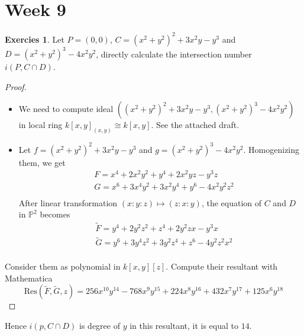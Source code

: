 \documentclass[12pt,a4paper]{article}
\theoremstyle{definition}
\newtheorem{exer}{Exercies}[section]
\begin{document}
\section{Week 9}
\begin{exer}
	Let $P=(0,0)$, $C = (x^2+y^2)^2 + 3x^2y -y^3$ and $D = (x^2+y^2)^3 -4x^2y^2$, directly calculate the intersection number $i(P, C\cap D)$.
\end{exer}
\begin{proof}
	\begin{itemize}
		\item We need to compute ideal $((x^2+y^2)^2+3x^2y-y^3, (x^2+y^2)
^3 -4x^2y^2)$ in local ring $k[x,y]_{(x,y)} \cong k[x,y]$. See the attached draft.
\item Let $f= (x^2+y^2)^2 + 3x^2y -y^3$ and $g=(x^2+y^2)^3 -4x^2y^2$. Homogenizing them, we get\[
\begin{aligned}
&F= x^4 +2x^2y^2+y^4 + 2x^2yz -y^3z\\
&G= x^6+3x^4y^2 +3x^2y^4 + y^6 -4x^2y^2z^2\\
\end{aligned}
\]
After linear transformation $(x:y:z) \mapsto (z:x:y)$, the equation of $C$ and $D$ in $\mathbb{P}^2$ becomes
\[
\begin{aligned}
&\tilde{F}= y^4 +2y^2z^2+z^4 + 2y^2zx -y^3x\\
&\tilde{G}= y^6+3y^4z^2 +3y^2z^4 + z^6 -4y^2z^2x^2\\
\end{aligned}
\]
	\end{itemize}
Consider them as polynomial in $k[x,y][z]$. Compute their resultant with Mathematica
\[
\text{Res}(\tilde{F},\tilde{G},z)= 256 x^{10} y^{14} - 768 x^9 y^{15} + 224 x^{8} y^{16} + 432 x^7 y^{17} + 125 x^6 y^{18}
\]
\end{proof}
Hence $i(p,C \cap D)$ is degree of $y$ in this resultant, it is equal to $14$.
\end{document}
